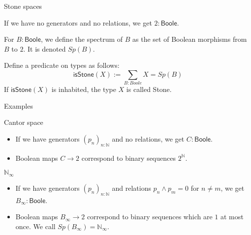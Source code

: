 \documentclass{beamer}
\newcommand{\Boole}{\mathsf{Boole}}
\newcommand{\isSt}{\mathsf{isStone}}
\begin{document}
\begin{frame}{Stone spaces}
  \begin{example}
    If we have no generators and no relations, we get $2:\Boole$.
  \end{example}
  \pause
\begin{definition}
  For $B:\Boole$, we define the spectrum of $B$ as 
  the set of Boolean morphisms from $B$ to $2$. 
  It is denoted $Sp(B)$.
\end{definition}
\pause
\begin{definition}
  Define a predicate on types as follows:
  \pause
  \begin{equation*}
    \isSt(X) := \sum\limits_{B : Boole} X = Sp(B)
  \end{equation*} 
  \pause 
  If $\isSt(X)$ is inhabited, the type $X$ is called Stone.
\end{definition}
\end{frame}

\begin{frame}{Examples}
  \begin{exampleblock}{Cantor space}
    \begin{itemize}
      \item 
        If we have generators $(p_n)_{n:\mathbb N}$ 
        and no relations, we get $C : \Boole$.
    \pause
  \item 
    Boolean maps $C \to 2$ correspond to \pause binary sequences $2^\mathbb N$.
    \end{itemize}
  \end{exampleblock}
  \pause
  \begin{exampleblock}{$\mathbb N_\infty$}
    \begin{itemize}
      \item 
    If we have generators $(p_n)_{n:\mathbb N}$ \pause 
    and relations $p_n \wedge p_m = 0$ for 
    $n \neq m$, \pause   we get $B_\infty:\Boole$. 
    \item 
    \pause
    Boolean maps $B_\infty \to 2$ correspond to \pause 
    binary sequences \pause which are $1$ at most once.
    \pause
    We call $Sp(B_\infty) = \mathbb N_\infty$. 
    \end{itemize}
  \end{exampleblock}
\end{frame}
\end{document}
